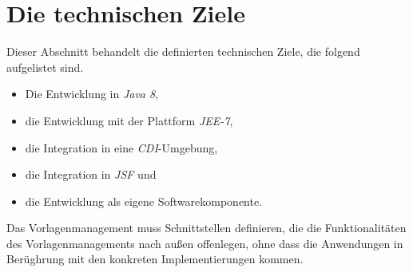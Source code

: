 \section{Die technischen Ziele}
\label{sec:technical-goals}
Dieser Abschnitt behandelt die definierten technischen Ziele, die folgend aufgelistet sind.
\begin{itemize}
	\item Die Entwicklung in \emph{Java 8},
	\item die Entwicklung mit der Plattform \emph{JEE-7},
	\item die Integration in eine \emph{CDI}-Umgebung,
	\item die Integration in \emph{JSF} und
	\item die Entwicklung als eigene Softwarekomponente.
\end{itemize}
Das Vorlagenmanagement muss Schnittstellen definieren, die die Funktionalitäten des Vorlagenmanagements nach außen offenlegen, ohne dass die Anwendungen in Berüghrung mit den konkreten Implementierungen kommen.